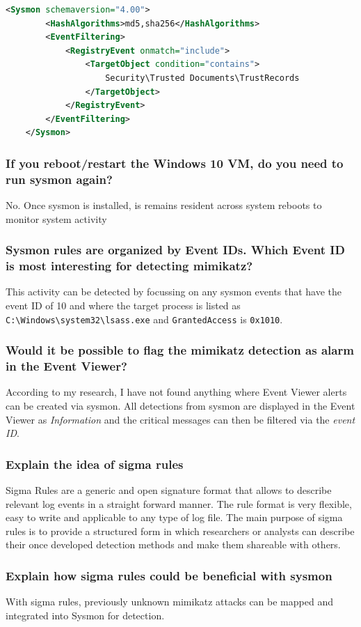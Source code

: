 \begin{lstlisting}[language=XML]
    <Sysmon schemaversion="4.00">
        <HashAlgorithms>md5,sha256</HashAlgorithms>
        <EventFiltering>
            <RegistryEvent onmatch="include">
                <TargetObject condition="contains">
                    Security\Trusted Documents\TrustRecords
                </TargetObject>
            </RegistryEvent>
        </EventFiltering>
    </Sysmon>
\end{lstlisting}

\subsubsection{If you reboot/restart the Windows 10 VM, do you need to run sysmon again?}
No. Once sysmon is installed, is remains resident across system reboots to monitor system activity

\subsubsection{Sysmon rules are organized by Event IDs. Which Event ID is most interesting for detecting mimikatz?}
This activity can be detected by focussing on any sysmon events that have the event ID of 10 and where the target process is listed as \lstinline|C:\Windows\system32\lsass.exe| and \lstinline|GrantedAccess| is \lstinline|0x1010|.

\subsubsection{Would it be possible to flag the mimikatz detection as alarm in the Event Viewer?}
According to my research, I have not found anything where Event Viewer alerts can be created via sysmon. All detections from sysmon are displayed in the Event Viewer as \textit{Information}\color{black} and the critical messages can then be filtered via the \textit{event ID}.

\columnbreak

\subsubsection{Explain the idea of sigma rules}
Sigma Rules are a generic and open signature format that allows to describe relevant log events in a straight forward manner. The rule format is very flexible, easy to write and applicable to any type of log file. The main purpose of sigma rules is to provide a structured form in which researchers or analysts can describe their once developed detection methods and make them shareable with others.

\subsubsection{Explain how sigma rules could be beneficial with sysmon}
With sigma rules, previously unknown mimikatz attacks can be mapped and integrated into Sysmon for detection.
